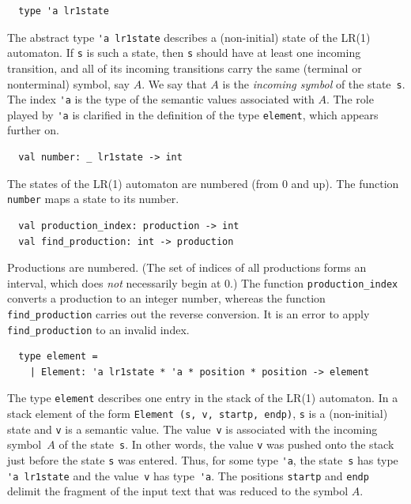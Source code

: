 \documentclass[onecolumn,11pt,nocopyrightspace,preprint]{sigplanconf}
\begin{document}
\begin{verbatim}
  type 'a lr1state
\end{verbatim}

The abstract type \verb+'a lr1state+ describes a (non-initial) state of the
LR(1) automaton.
%
If \verb+s+ is such a state, then \verb+s+ should have at least one incoming
transition, and all of its incoming transitions carry the same (terminal or
nonterminal) symbol, say $A$. We say that $A$ is the \emph{incoming symbol}
of the state~\verb+s+.
%
The index \verb+'a+ is the type of the semantic values associated with $A$.
The role played by \verb+'a+ is clarified in the definition of the
type \verb+element+, which appears further on.


\begin{verbatim}
  val number: _ lr1state -> int
\end{verbatim}

The states of the LR(1) automaton are numbered (from 0 and up).
The function \verb+number+ maps a state to its number.


\begin{verbatim}
  val production_index: production -> int
  val find_production: int -> production
\end{verbatim}

Productions are numbered. (The set of indices of all productions forms an
interval, which does \emph{not} necessarily begin at 0.)
%
The function \verb+production_index+ converts a production to an integer
number, whereas the function \verb+find_production+ carries out the reverse
conversion. It is an error to apply \verb+find_production+ to an invalid
index.


\begin{verbatim}
  type element =
    | Element: 'a lr1state * 'a * position * position -> element
\end{verbatim}

The type \verb+element+ describes one entry in the stack of the LR(1)
automaton. In a stack element of the form \verb+Element (s, v, startp, endp)+,
\verb+s+ is a (non-initial) state and \verb+v+ is a semantic value. The
value~\verb+v+ is associated with the incoming symbol~$A$ of the
state~\verb+s+. In other words, the value \verb+v+ was pushed onto the stack
just before the state \verb+s+ was entered. Thus, for some type \verb+'a+, the
state~\verb+s+ has type \verb+'a lr1state+ and the value~\verb+v+ has
type~\verb+'a+. The positions \verb+startp+ and \verb+endp+ delimit the
fragment of the input text that was reduced to the symbol $A$.
\end{document}
